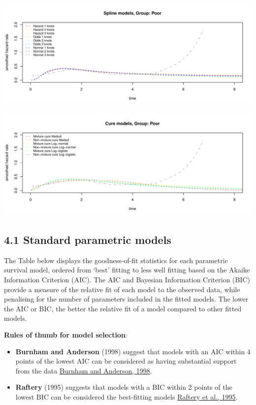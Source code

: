 \documentclass[
]{article}
\providecommand{\tightlist}{%
  \setlength{\itemsep}{0pt}\setlength{\parskip}{0pt}}
\begin{document}
\begin{flushleft}\includegraphics[height=0.29\textheight]{BC_OS_output/Images/Figure_plot_haz_pred-8} \end{flushleft}

\begin{flushleft}\includegraphics[height=0.29\textheight]{BC_OS_output/Images/Figure_plot_haz_pred-9} \end{flushleft}

\subsection{4.1 Standard parametric
models}\label{standard-parametric-models}

The Table below displays the goodness-of-fit statistics for each
parametric survival model, ordered from `best' fitting to less well
fitting based on the Akaike Information Criterion (AIC). The AIC and
Bayesian Information Criterion (BIC) provide a measure of the relative
fit of each model to the observed data, while penalising for the number
of parameters included in the fitted models. The lower the AIC or BIC,
the better the relative fit of a model compared to other fitted models.

\textbf{Rules of thumb for model selection}:

\begin{itemize}
\tightlist
\item
  \textbf{Burnham and Anderson} (1998) suggest that models with an AIC
  within 4 points of the lowest AIC can be considered as having
  substantial support from the data
  \href{https://doi.org/10.1007/978-1-4757-2917-7}{Burnham and Anderson,
  1998}.\\
\item
  \textbf{Raftery} (1995) suggests that models with a BIC within 2
  points of the lowest BIC can be considered the best-fitting models
  \href{https://doi.org/10.2307/271063}{Raftery et al., 1995}.
\end{itemize}
\end{document}
